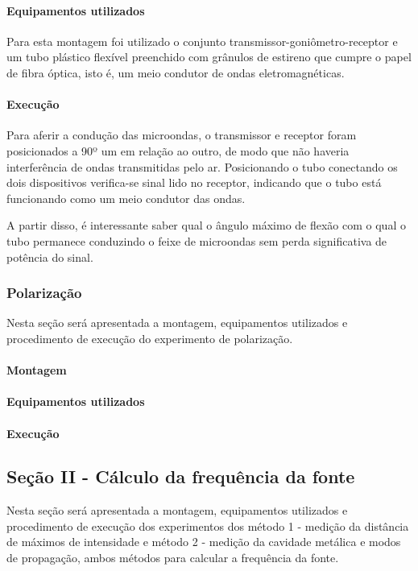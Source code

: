 \documentclass[12pt]{article}
\begin{document}
\paragraph{Equipamentos utilizados}
Para esta montagem foi utilizado o conjunto
transmissor-goniômetro-receptor e um tubo plástico flexível
preenchido com grânulos de estireno que cumpre o papel de fibra
óptica, isto é, um meio condutor de ondas eletromagnéticas.

\paragraph{Execução}
Para aferir a condução das microondas, o transmissor e receptor foram
posicionados a 90º um em relação ao outro, de modo que não haveria
interferência de ondas transmitidas pelo ar. Posicionando o tubo
conectando os dois dispositivos verifica-se sinal lido no receptor,
indicando que o tubo está funcionando como um meio condutor das ondas.

A partir disso, é interessante saber qual o ângulo máximo de flexão
com o qual o tubo permanece conduzindo o feixe de microondas sem
perda significativa de potência do sinal.

\subsubsection{Polarização}
Nesta seção será apresentada a montagem, equipamentos utilizados e
procedimento de execução do experimento de polarização.

\paragraph{Montagem}
\paragraph{Equipamentos utilizados}
\paragraph{Execução}

\subsection{Seção II - Cálculo da frequência da fonte}
Nesta seção será apresentada a montagem, equipamentos utilizados e
procedimento de execução dos experimentos dos método 1 - medição da
distância de máximos de intensidade e método 2 - medição da cavidade
metálica e modos de propagação, ambos métodos para calcular a
frequência da fonte.
\end{document}
